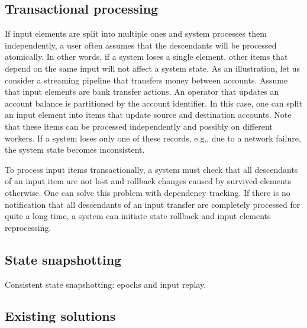 \subsection{Transactional processing}
If input elements are split into multiple ones and system processes them independently, a user often assumes that the descendants will be processed atomically. In other words, if a system loses a single element, other items that depend on the same input will not affect a system state. As an illustration, let us consider a streaming pipeline that transfers money between accounts. Assume that input elements are bank transfer actions. An operator that updates an account balance is partitioned by the account identifier. In this case, one can split an input element into items that update source and destination accounts. Note that these items can be processed independently and possibly on different workers. If a system loses only one of these records, e.g., due to a network failure, the system state becomes inconsistent.

To process input items transactionally, a system must check that all descendants of an input item are not lost and rollback changes caused by survived elements otherwise. One can solve this problem with dependency tracking. If there is no notification that all descendants of an input transfer are completely processed for quite a long time, a system can initiate state rollback and input elements reprocessing.

\subsection{State snapshotting}
Consistent state snapshotting: epochs and input replay.

\subsection{Existing solutions}




